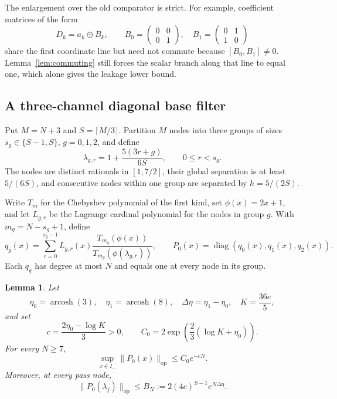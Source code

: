 \documentclass[11pt]{article}
\newtheorem{lemma}[theorem]{Lemma}
\theoremstyle{remark}
\newcommand{\op}{\mathrm{op}}
\newcommand{\diag}{\operatorname{diag}}
\begin{document}
The enlargement over the old comparator is strict.  For example, coefficient
matrices of the form
\[
 D_k=a_k\oplus B_k,\qquad
 B_0=\begin{pmatrix}0&0\\0&1\end{pmatrix},\quad
 B_1=\begin{pmatrix}0&1\\1&0\end{pmatrix}
\]
share the first coordinate line but need not commute because
$[B_0,B_1]\ne0$.  Lemma~\ref{lem:commuting} still forces the scalar branch
along that line to equal one, which alone gives the leakage lower bound.

\subsection{A three-channel diagonal base filter}

Put $M=N+3$ and $S=\lceil M/3\rceil$.  Partition $M$ nodes into three
groups of sizes $s_g\in\{S-1,S\}$, $g=0,1,2$, and define
\begin{equation}\label{eq:threechannelnodes}
 \lambda_{g,r}=1+\frac{5(3r+g)}{6S},
 \qquad 0\le r<s_g.
\end{equation}
The nodes are distinct rationals in $[1,7/2]$, their global separation is at
least $5/(6S)$, and consecutive nodes within one group are separated by
$h=5/(2S)$.

Write $T_m$ for the Chebyshev polynomial of the first kind, set
$\phi(x)=2x+1$, and let $L_{g,r}$ be the Lagrange cardinal polynomial for
the nodes in group $g$.  With $m_g=N-s_g+1$, define
\begin{equation}\label{eq:multinodechebyshev}
 q_g(x)=\sum_{r=0}^{s_g-1}L_{g,r}(x)
       \frac{T_{m_g}(\phi(x))}{T_{m_g}(\phi(\lambda_{g,r}))},
 \qquad P_0(x)=\diag(q_0(x),q_1(x),q_2(x)).
\end{equation}
Each $q_g$ has degree at most $N$ and equals one at every node in its group.

\begin{lemma}\label{lem:base}
Let
\[
 \eta_0=\operatorname{arcosh}(3),\quad
 \eta_1=\operatorname{arcosh}(8),\quad
 \Delta\eta=\eta_1-\eta_0,
 \quad K=\frac{36e}{5},
\]
and set
\[
 c=\frac{2\eta_0-\log K}{3}>0,\qquad
 C_0=2\exp\!\left(\frac23(\log K+\eta_0)\right).
\]
For every $N\ge7$,
\[
 \sup_{x\in I_-}\|P_0(x)\|_{\op}\le C_0e^{-cN}.
\]
Moreover, at every pass node,
\[
 \|P_0(\lambda_j)\|_{\op}
 \le B_N:=2(4e)^{S-1}e^{N\Delta\eta}.
\]
\end{lemma}
\end{document}
